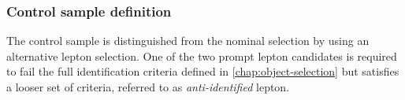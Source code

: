 \subsubsection{Control sample definition}
The control sample is distinguished from the nominal selection by using an alternative lepton selection. 
One of the two prompt lepton candidates is required to fail the full identification criteria defined in \cref{chap:object-selection} but satisfies a looser set of criteria, referred to as \emph{anti-identified} lepton.
